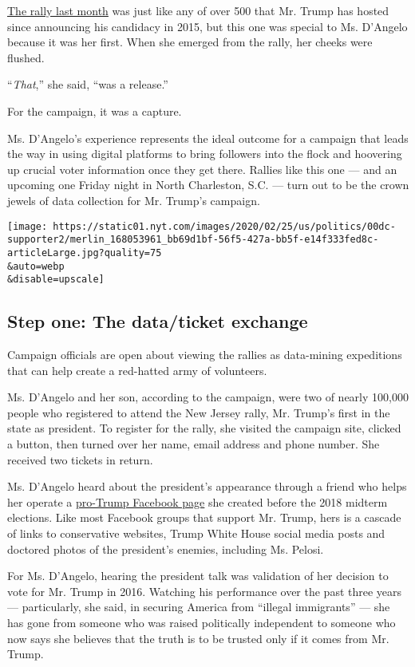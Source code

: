 \href{https://www.nytimes.com/2020/01/28/us/politics/trump-new-jersey-rally.html}{The
rally last month} was just like any of over 500 that Mr. Trump has
hosted since announcing his candidacy in 2015, but this one was special
to Ms. D'Angelo because it was her first. When she emerged from the
rally, her cheeks were flushed.

``\emph{That},'' she said, ``was a release.''

For the campaign, it was a capture.

Ms. D'Angelo's experience represents the ideal outcome for a campaign
that leads the way in using digital platforms to bring followers into
the flock and hoovering up crucial voter information once they get
there. Rallies like this one --- and an upcoming one Friday night in
North Charleston, S.C. --- turn out to be the crown jewels of data
collection for Mr. Trump's campaign.

\texttt{[image: https://static01.nyt.com/images/2020/02/25/us/politics/00dc-supporter2/merlin\_168053961\_bb69d1bf-56f5-427a-bb5f-e14f333fed8c-articleLarge.jpg?quality=75\\\&auto=webp\\\&disable=upscale]}

\hypertarget{step-one-the-dataticket-exchange}{%
\subsection{Step one: The data/ticket
exchange}\label{step-one-the-dataticket-exchange}}

Campaign officials are open about viewing the rallies as data-mining
expeditions that can help create a red-hatted army of volunteers.

Ms. D'Angelo and her son, according to the campaign, were two of nearly
100,000 people who registered to attend the New Jersey rally, Mr.
Trump's first in the state as president. To register for the rally, she
visited the campaign site, clicked a button, then turned over her name,
email address and phone number. She received two tickets in return.

Ms. D'Angelo heard about the president's appearance through a friend who
helps her operate a
\href{https://www.facebook.com/groups/517022238508560//}{pro-Trump
Facebook page} she created before the 2018 midterm elections. Like most
Facebook groups that support Mr. Trump, hers is a cascade of links to
conservative websites, Trump White House social media posts and doctored
photos of the president's enemies, including Ms. Pelosi.

For Ms. D'Angelo, hearing the president talk was validation of her
decision to vote for Mr. Trump in 2016. Watching his performance over
the past three years --- particularly, she said, in securing America
from ``illegal immigrants'' --- she has gone from someone who was raised
politically independent to someone who now says she believes that the
truth is to be trusted only if it comes from Mr. Trump.

